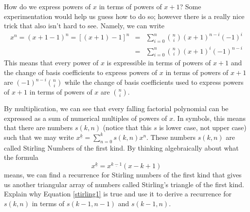 {{How do we express powers of $x$ in terms of powers of $x+1$?  Some
experimentation would help us guess how to do so; however there is a
really nice trick that also isn't hard to see.  Namely, we can write
\begin{eqnarray*}
x^n =(x+1-1)^n= [(x+1) -1]^n&=& \sum_{i=0}^n {n\choose
i}(x+1)^{n-i}(-1)^i\\ &=&
\sum_{i=0}^n {n\choose i}(x+1)^i(-1)^{n-i}%
\end{eqnarray*}
This means that every power of $x$ is expressible in terms of powers
of $x+1$ and the change of basis coefficients to express powers of $x$
in terms of powers of $x+1$ are $(-1)^{n-i}{n\choose i}$ while the
change of basis coefficients used to express powers of $x+1$ in terms
of powers of $x$ are $n\choose i$.
}

\itemesi By multiplication, we can see that every falling factorial
polynomial can be expressed as a sum of numerical multiples of powers of
$x$.  In symbols, this means that there are numbers $s(k,n)$ (notice that
this $s$ is lower case, not upper case) such that we may write
$x^{\underline{k}} =
\sum_{n=0}^k s(k,n)x^n$.  These numbers $s(k,n)$ are
called Stirling Numbers of the first kind.  By thinking algebraically about what the formula 
 \begin{equation} 
x^{\underline{k}} =
x^{\underline{k-1}}(x-k+1)\label{stirling1}
 \end{equation} 
means, we can
find a recurrence for Stirling numbers of the first kind that gives us
another triangular array of numbers called Stirling's triangle of the
first kind.  Explain why Equation
\ref{stirling1} is true and use it to derive a recurrence for $s(k,n)$ in
terms of $s(k-1,n-1)$ and $s(k-1,n)$.\label{Stirlingfirst}
}
